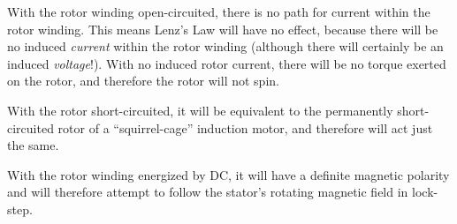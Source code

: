 \vskip 10pt

With the rotor winding open-circuited, there is no path for current within the rotor winding.  This means Lenz's Law will have no effect, because there will be no induced {\it current} within the rotor winding (although there will certainly be an induced {\it voltage}!).  With no induced rotor current, there will be no torque exerted on the rotor, and therefore the rotor will not spin.

\vskip 10pt

With the rotor short-circuited, it will be equivalent to the permanently short-circuited rotor of a ``squirrel-cage'' induction motor, and therefore will act just the same.

\vskip 10pt

With the rotor winding energized by DC, it will have a definite magnetic polarity and will therefore attempt to follow the stator's rotating magnetic field in lock-step.












